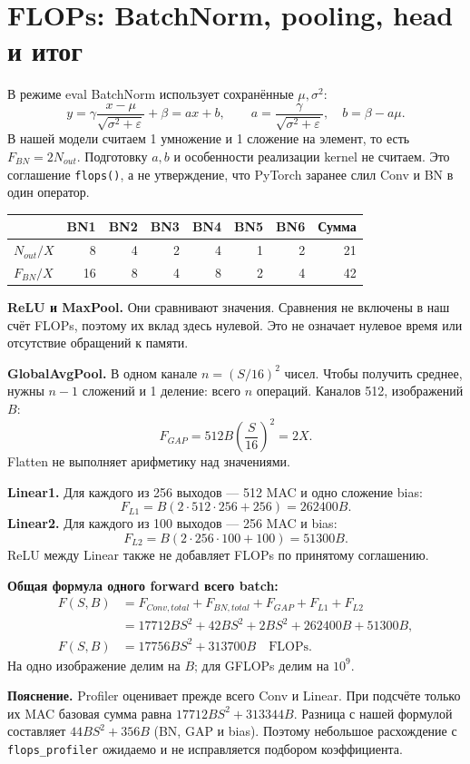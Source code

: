 \documentclass[11pt,a4paper]{article}
\newcommand{\page}[1]{\clearpage\section{#1}}
\newcommand{\note}[1]{\par\textbf{Пояснение.} #1\par}
\begin{document}
\page{FLOPs: BatchNorm, pooling, head и итог}
В режиме eval BatchNorm использует сохранённые $\mu,\sigma^2$:
\[
 y=\gamma\frac{x-\mu}{\sqrt{\sigma^2+\varepsilon}}+\beta
   =a x+b,\qquad
 a=\frac{\gamma}{\sqrt{\sigma^2+\varepsilon}},\quad b=\beta-a\mu.
\]
В нашей модели считаем 1 умножение и 1 сложение на элемент, то есть
$F_{BN}=2N_{out}$. Подготовку $a,b$ и особенности реализации kernel не считаем.
Это соглашение \texttt{flops()}, а не утверждение, что PyTorch заранее
слил Conv и BN в один оператор.

\begin{center}
\begin{tabular}{lrrrrrrr}
\toprule
 & BN1 & BN2 & BN3 & BN4 & BN5 & BN6 & Сумма \\
\midrule
$N_{out}/X$ & 8 & 4 & 2 & 4 & 1 & 2 & 21 \\
$F_{BN}/X$ & 16 & 8 & 4 & 8 & 2 & 4 & 42 \\
\bottomrule
\end{tabular}
\end{center}

\textbf{ReLU и MaxPool.} Они сравнивают значения. Сравнения не включены
в наш счёт FLOPs, поэтому их вклад здесь нулевой. Это не означает
нулевое время или отсутствие обращений к памяти.

\textbf{GlobalAvgPool.} В одном канале $n=(S/16)^2$ чисел.
Чтобы получить среднее, нужны $n-1$ сложений и 1 деление: всего $n$ операций.
Каналов 512, изображений $B$:
\[
 F_{GAP}=512B\left(\frac{S}{16}\right)^2=2X.
\]
Flatten не выполняет арифметику над значениями.

\textbf{Linear1.} Для каждого из 256 выходов --- 512 MAC и одно сложение bias:
\[
 F_{L1}=B(2\cdot512\cdot256+256)=262400B.
\]
\textbf{Linear2.} Для каждого из 100 выходов --- 256 MAC и bias:
\[
 F_{L2}=B(2\cdot256\cdot100+100)=51300B.
\]
ReLU между Linear также не добавляет FLOPs по принятому соглашению.

\textbf{Общая формула одного forward всего batch:}
\begin{align*}
 F(S,B)&=F_{Conv,total}+F_{BN,total}+F_{GAP}+F_{L1}+F_{L2}\\
 &=17712BS^2+42BS^2+2BS^2+262400B+51300B,\\
 \boxed{F(S,B)}&\boxed{=17756BS^2+313700B\quad\text{FLOPs}.}
\end{align*}
На одно изображение делим на $B$; для GFLOPs делим на $10^9$.

\note{Profiler оценивает прежде всего Conv и Linear. При подсчёте только
их MAC базовая сумма равна $17712BS^2+313344B$. Разница с нашей формулой
составляет $44BS^2+356B$ (BN, GAP и bias). Поэтому небольшое расхождение
с \texttt{flops\_profiler} ожидаемо и не исправляется подбором коэффициента.}
\end{document}
